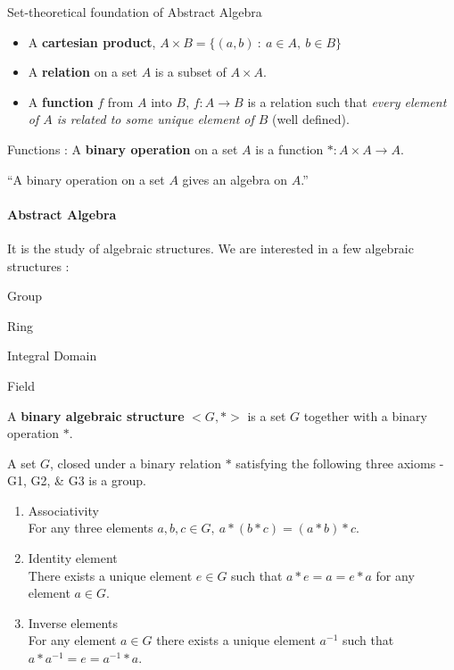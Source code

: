 \begin{definition}Set-theoretical foundation of Abstract Algebra
	\begin{itemize}
		\item A \textbf{cartesian product}, $A \times B = \{ (a,b) \ : \ a \in A,\ b \in B \}$ %
		\item A \textbf{relation} on a set $A$ is a subset of $A \times A$. %
		\item A \textbf{function} $f$ from $A$ into $B$,
			$f : A \to B$ is a relation such that \textit{every element of $A$ is related to some unique element of $B$}
			(well defined). %
	\end{itemize}
\end{definition}

\begin{definition} Functions :
	A \textbf{binary operation} on a set $A$ is a function $\ast : A \times A \to A$. %
\end{definition}

``A binary operation on a set $A$ gives an algebra on $A$.'' %
\begin{story}
\paragraph{Abstract Algebra}
	It is the study of algebraic structures.
	We are interested in a few algebraic structures :
	\begin{enumerate*}
		\item Group
		\item Ring
		\item Integral Domain
		\item Field
	\end{enumerate*}
\end{story}

\begin{definition}
	A \textbf{binary algebraic structure} $<\!G,\ast\!>$ is a set $G$ together with a binary operation $\ast$.
\end{definition}

\begin{definition}[Group]
	A set $G$, closed under a binary relation $\ast$ satisfying the following three axioms -G1, G2, \& G3 is a group.%
\begin{enumerate}[label=G\arabic*]
	\item Associativity \\
		For any three elements $a,b,c \in G,\ a \ast (b \ast c) = (a \ast b) \ast c$.
	\item Identity element\\
		There exists a unique element $e \in G$ such that $a \ast e = a = e \ast a$ for any element $a \in G$.
	\item Inverse elements\\
		For any element $a \in G$ there exists a unique element $a^{-1}$ such that $a \ast a^{-1} = e = a^{-1} \ast a$.
\end{enumerate}
\end{definition}

